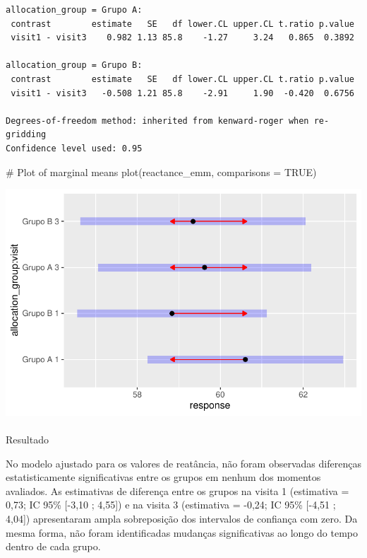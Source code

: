\documentclass[
  12pt,
]{article}
\makeatletter
\let\oldparagraph\paragraph
\renewcommand{\paragraph}{
    \@ifstar
      \xxxParagraphStar
      \xxxParagraphNoStar
  }
\newcommand{\xxxParagraphStar}[1]{\oldparagraph*{#1}\mbox{}}
\newcommand{\xxxParagraphNoStar}[1]{\oldparagraph{#1}\mbox{}}
\newenvironment{Shaded}{\begin{snugshade}}{\end{snugshade}}
\newcommand{\AttributeTok}[1]{\textcolor[rgb]{0.40,0.45,0.13}{#1}}
\newcommand{\CommentTok}[1]{\textcolor[rgb]{0.37,0.37,0.37}{#1}}
\newcommand{\ConstantTok}[1]{\textcolor[rgb]{0.56,0.35,0.01}{#1}}
\newcommand{\FunctionTok}[1]{\textcolor[rgb]{0.28,0.35,0.67}{#1}}
\newcommand{\NormalTok}[1]{\textcolor[rgb]{0.00,0.23,0.31}{#1}}
\makeatother
\begin{document}
\begin{verbatim}
allocation_group = Grupo A:
 contrast        estimate   SE   df lower.CL upper.CL t.ratio p.value
 visit1 - visit3    0.982 1.13 85.8    -1.27     3.24   0.865  0.3892

allocation_group = Grupo B:
 contrast        estimate   SE   df lower.CL upper.CL t.ratio p.value
 visit1 - visit3   -0.508 1.21 85.8    -2.91     1.90  -0.420  0.6756

Degrees-of-freedom method: inherited from kenward-roger when re-gridding 
Confidence level used: 0.95 
\end{verbatim}

\begin{Shaded}
\begin{Highlighting}[]
\CommentTok{\# Plot of marginal means}
\FunctionTok{plot}\NormalTok{(reactance\_emm, }\AttributeTok{comparisons =} \ConstantTok{TRUE}\NormalTok{)}
\end{Highlighting}
\end{Shaded}

\includegraphics{Outcomes_files/figure-pdf/reactance_sens_emm-1.pdf}

\paragraph{Resultado}\label{resultado-18}

No modelo ajustado para os valores de reatância, não foram observadas
diferenças estatisticamente significativas entre os grupos em nenhum dos
momentos avaliados. As estimativas de diferença entre os grupos na
visita 1 (estimativa = 0,73; IC 95\% {[}-3,10 ; 4,55{]}) e na visita 3
(estimativa = -0,24; IC 95\% {[}-4,51 ; 4,04{]}) apresentaram ampla
sobreposição dos intervalos de confiança com zero. Da mesma forma, não
foram identificadas mudanças significativas ao longo do tempo dentro de
cada grupo.
\end{document}
